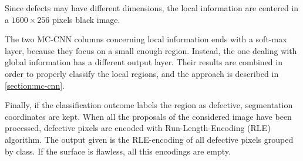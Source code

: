     \par{
        Since defects may have different dimensions, the local information are centered in a $1600\times 256$ pixels black image.
    }
    \par{
        The two MC-CNN columns concerning local information ends with a soft-max layer, because they focus on a small enough region. Instead, the one dealing with global information has a different output layer. Their results are combined in order to properly classify the local regions, and the approach is described in \ref{section:mc-cnn}.
    }
    \par{
        Finally, if the classification outcome labels the region as defective, segmentation coordinates are kept. When all the proposals of the considered image have been processed, defective pixels are encoded with Run-Length-Encoding (RLE) algorithm. The output given is the RLE-encoding of all defective pixels grouped by class. If the surface is flawless, all this encodings are empty.
    }